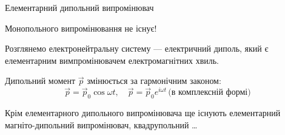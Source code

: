 \documentclass[onlytextwidth]{beamer}
\let\vect\vec
\begin{document}
\begin{frame}{Елементарний дипольний випромінювач}{}
	\begin{alertblock}{}\centering
		Монопольного випромінювання не існує!
	\end{alertblock}

	Розглянемо електронейтральну систему --- електричний диполь, який є елементарним вимпромінювачем електромагнітних хвиль.
	\begin{center}
\begin{pict}
\end{pict}
	\end{center}

	Дипольний момент $ \vect{p} $ змінюється за гармонічним законом:
	\begin{equation*}
		\vect{p} = \vect{p}_0 \cos\omega t, \quad 	\vect{p} = \vect{p}_0e^{i\omega t}\, \text{(в комплексній формі)}
	\end{equation*}

	\begin{block}{}
		Крім елементарного дипольного випромінювача ще існують елементарний магніто-дипольний випромінювач, квадрупольний \ldots
	\end{block}
\end{frame}
\end{document}
